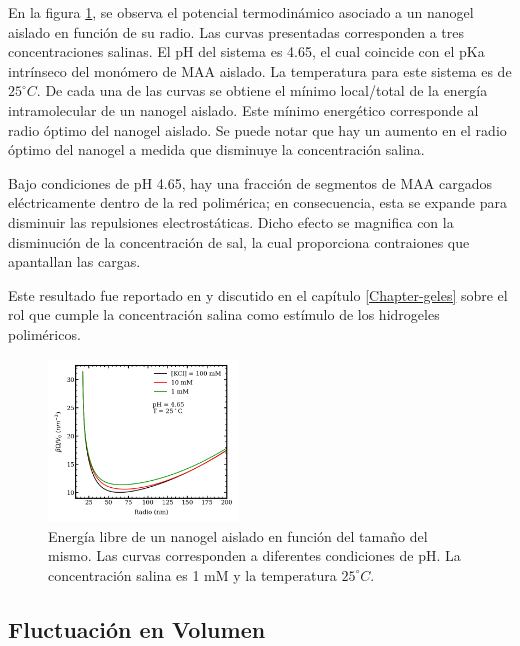 	En la figura \ref{fig:mc:energy-intra}, se observa el potencial termodin\'amico asociado a un nanogel aislado en funci\'on de su radio. Las curvas presentadas corresponden a tres concentraciones salinas. El pH del sistema es 4.65, el cual coincide con el pKa intr\'inseco del mon\'omero de MAA aislado. La temperatura para este sistema es de $25 ^\circ C$. De cada una de las curvas se obtiene el m\'inimo local/total de la energ\'ia intramolecular de un nanogel aislado. Este m\'inimo energ\'etico corresponde al radio \'optimo del nanogel aislado. Se puede notar que hay un aumento en el radio \'optimo del nanogel a medida que disminuye la concentraci\'on salina.
	
	Bajo condiciones de pH 4.65, hay una fracci\'on de segmentos de MAA cargados el\'ectricamente dentro de la red polim\'erica; en consecuencia, esta se expande para disminuir las repulsiones electrost\'aticas. Dicho efecto se magnifica con la disminuci\'on de la concentraci\'on de sal, la cual proporciona contraiones que apantallan las cargas.
	
	Este resultado fue reportado en \cite{perez2021thermodynamic} y discutido en el cap\'itulo \ref{Chapter-geles} sobre el rol que cumple la concentraci\'on salina como est\'imulo de los hidrogeles polim\'ericos.
	
	
	\begin{figure}[!htb]
		\centering
		\includegraphics[width=0.45\textwidth]{Figures/graph-mc/interna.png}
		\caption{Energ\'ia libre de un nanogel aislado en funci\'on del tama\~no del mismo. Las curvas corresponden a diferentes condiciones de pH. La concentraci\'on salina es 1 mM y la temperatura $25 ^\circ C$.}
		\label{fig:mc:energy-intra}
	\end{figure}
	
	
	\subsection{Fluctuaci\'on en Volumen}\label{sec:mc:fluctuacion}
	
